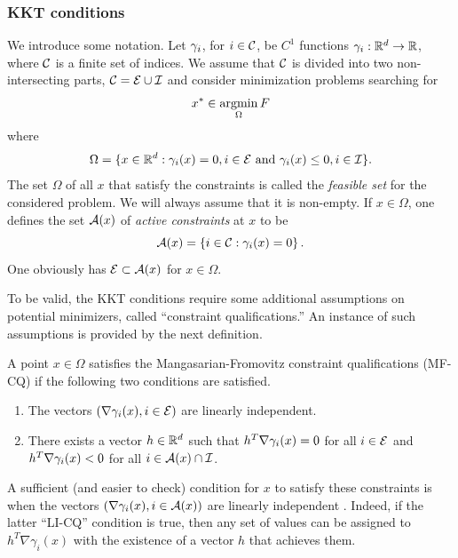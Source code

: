 \subsubsection{KKT conditions}
\label{sec:kkt.smooth}

We introduce some notation.
Let $\gamma_i$, for $i\in {\mathcal C}$, be $C^1$ functions  $\gamma_i: {\mathbb{R}}^d \to {\mathbb{R}}$, where ${\mathcal C}$ is a finite set of indices.
We assume that ${\mathcal C}$ is divided into two non-intersecting parts, ${\mathcal C} = {\mathcal E} \cup {\mathcal I}$ and consider minimization problems searching for
\begin{equation}
\label{eq:min.eq.cons}
x^* \in \operatorname*{argmin}_{\Omega} F
\end{equation}
where
\begin{equation}
\label{eq:omega.constraints}
\Omega = \{x\in {\mathbb{R}}^d: \gamma_i(x) = 0, i\in {\mathcal E} \text{ and } \gamma_i(x) \leq 0, i\in {\mathcal I}\}.
\end{equation}
The set  $\Omega$ of all $x$ that satisfy the constraints is called the {\em feasible set} for the considered problem. We will always assume that  it is non-empty. If $x\in \Omega$, one defines the set ${\mathcal A}(x)$ of {\em active constraints} at $x$ to be 
\[
{\mathcal A}(x) = \left\{ i\in {\mathcal C}: \gamma_i(x) = 0 \right\}.
\]
One obviously has ${\mathcal E}\subset {\mathcal A}(x)$ for $x\in \Omega$. 

To be valid, the KKT conditions require some additional assumptions on potential minimizers, called ``constraint qualifications.''  An instance of such assumptions is provided by the next definition.
\begin{definition}
\label{def:mfcq}
A point $x\in \Omega$ satisfies the  Mangasarian-Fromovitz constraint qualifications (MF-CQ) if the following two conditions are satisfied. 
\begin{enumerate}[label=(MF\arabic*)]
\item The vectors $(\nabla \gamma_i(x), i\in {\mathcal E})$ are linearly independent.
\item There exists  a vector $h\in {\mathbb{R}}^d$ such that $h^T \nabla \gamma_i(x) = 0$ for all $i\in{\mathcal E}$ and $h^T \nabla \gamma_i(x) < 0$ for all $i\in {\mathcal A}(x)\cap{\mathcal I}$. 
\end{enumerate}
\end{definition}
A sufficient (and easier to check) condition for $x$ to satisfy these constraints is when the vectors  $(\nabla \gamma_i(x), i\in {\mathcal A}(x))$ are linearly independent \citep{borwein2010convex}. Indeed, if the latter ``LI-CQ'' condition is true, then any set of values can be assigned to $h^T \nabla \gamma_i(x)$ with the existence of a vector $h$ that achieves them.

